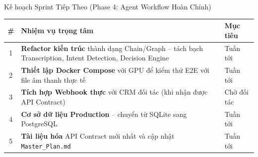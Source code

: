 \begin{frame}{Kế hoạch Sprint Tiếp Theo (Phase 4: Agent Workflow Hoàn Chỉnh)}
    \vspace{0.3cm}
    \begin{table}[]
        \centering
        \renewcommand{\arraystretch}{1.5}
        \begin{tabular}{|c|p{7.5cm}|l|}
            \hline
            \textbf{\#} & \textbf{Nhiệm vụ trọng tâm} & \textbf{Mục tiêu} \\ \hline
            1 & \textbf{Refactor kiến trúc} thành dạng Chain/Graph -- tách bạch Transcription, Intent Detection, Decision Engine & Tuần tới \\ \hline
            2 & \textbf{Thiết lập Docker Compose} với GPU để kiểm thử E2E với file âm thanh thực tế & Tuần tới \\ \hline
            3 & \textbf{Tích hợp Webhook thực} với CRM đối tác (khi nhận được API Contract) & Chờ đối tác \\ \hline
            4 & \textbf{Cơ sở dữ liệu Production} -- chuyển từ SQLite sang PostgreSQL & Tuần tới \\ \hline
            5 & \textbf{Tài liệu hóa} API Contract mới nhất và cập nhật \texttt{Master\_Plan.md} & Tuần tới \\ \hline
        \end{tabular}
    \end{table}
\end{frame}
